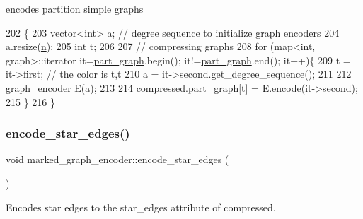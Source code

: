 encodes partition simple graphs 


\begin{DoxyCode}
202 \{
203   vector<int> a; \textcolor{comment}{// degree sequence to initialize graph encoders }
204   a.resize(\hyperlink{classmarked__graph__encoder_a4c66d9fdbc14c97523715aac7e4511cb}{n});
205   \textcolor{keywordtype}{int} t;
206 
207   \textcolor{comment}{// compressing graphs}
208   \textcolor{keywordflow}{for} (map<int, graph>::iterator it=\hyperlink{classmarked__graph__encoder_adbafd0769ae301acc1b2c19b5e1d4844}{part\_graph}.begin(); it!=\hyperlink{classmarked__graph__encoder_adbafd0769ae301acc1b2c19b5e1d4844}{part\_graph}.end(); it++)\{
209     t = it->first; \textcolor{comment}{// the color is t,t}
210     a = it->second.get\_degree\_sequence();
211 
212     \hyperlink{classgraph__encoder}{graph\_encoder} E(a);
213 
214     \hyperlink{classmarked__graph__encoder_ac2ded200860fdd2321f86dd76b28bcb3}{compressed}.\hyperlink{classmarked__graph__compressed_ae179a4737e6eab905c18a94d44ef64b7}{part\_graph}[t] = E.encode(it->second);
215   \}  
216 \}
\end{DoxyCode}
\mbox{\label{classmarked__graph__encoder_ad6883669a47d24e3d9898978f3252727}} 
\subsubsection{\texorpdfstring{encode\+\_\+star\+\_\+edges()}{encode\_star\_edges()}}
{\footnotesize\ttfamily void marked\+\_\+graph\+\_\+encoder\+::encode\+\_\+star\+\_\+edges (\begin{DoxyParamCaption}{ }\end{DoxyParamCaption})\hspace{0.3cm}{\ttfamily [private]}}



Encodes star edges to the star\+\_\+edges attribute of compressed. 


